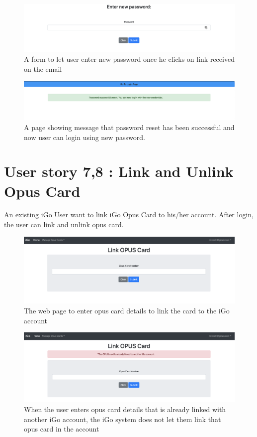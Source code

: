 \documentclass[11pt, english]{report}
\begin{document}
\begin{figure}[H]
  \includegraphics[width=1\textwidth]{images/reset_password_form.png}
  \centering
  \caption{A form to let user enter new password once he clicks on link received on the email}
\end{figure}

\begin{figure}[H]
  \includegraphics[width=1\textwidth]{images/password_reset_successful.png}
  \centering
  \caption{A page showing message that password reset has been successful and now user can login using new password.}
\end{figure}

\section{User story 7,8 : Link and Unlink Opus Card}

An existing iGo User want to link iGo Opus Card to his/her account. After login, the user can link and unlink opus card.

\begin{figure}[H]
  \includegraphics[width=1\textwidth]{images/link_opus_card_page.png}
  \centering
  \caption{The web page to enter opus card details to link the card to the iGo account}
\end{figure}

\begin{figure}[H]
  \includegraphics[width=1\textwidth]{images/already_linked_opus_card.png}
  \centering
  \caption{When the user enters opus card details that is already linked with another iGo account, the iGo system does not let them link that opus card in the account}
\end{figure}
\end{document}
